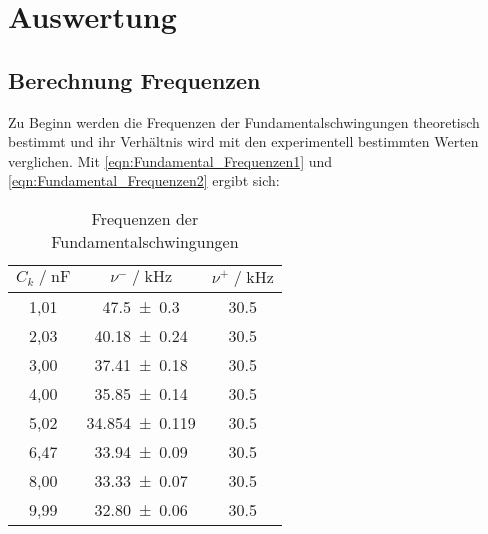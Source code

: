 \newpage
\section{Auswertung}
\subsection{Berechnung Frequenzen}
Zu Beginn werden die Frequenzen der Fundamentalschwingungen theoretisch bestimmt und ihr Verhältnis wird mit den experimentell bestimmten Werten verglichen.
Mit \ref{eqn:Fundamental_Frequenzen1} und \ref{eqn:Fundamental_Frequenzen2} ergibt sich:

\begin{table}[H]
    \centering
    \begin{tabular}{c c c}
        \toprule
        $C_k \; / \; \si{\nano \farad}$    &   $\nu^- \; / \; \si{\kilo \hertz}$  &  $\nu^+ \; / \; \si{\kilo \hertz}$ \\
        \midrule
        1,01 & \num{47,5\pm 0,3 }         & \num{30,5 }  \\
        2,03 & \num{40,18\pm 0,24 }     & \num{30,5 }  \\
        3,00 & \num{37,41\pm 0,18 }     & \num{30,5 }  \\
        4,00 & \num{35,85\pm 0,14 }     & \num{30,5 }  \\
        5,02 & \num{34,854\pm 0,119 }   & \num{30,5 }  \\
        6,47 & \num{33,94\pm 0,09 }     & \num{30,5 }  \\
        8,00 & \num{33,33\pm 0,07 }     & \num{30,5 }  \\
        9,99 & \num{32,80\pm 0,06 }     & \num{30,5 }  \\
        \bottomrule
    \end{tabular}
    \caption{Frequenzen der Fundamentalschwingungen}
    \label{tab:Frequenzen}
\end{table}


